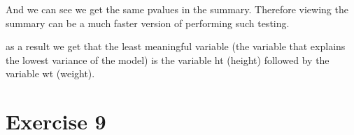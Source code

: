 \documentclass[]{article}
\begin{document}
And we can see we get the same pvalues in the summary. Therefore viewing
the summary can be a much faster version of performing such testing.

as a result we get that the least meaningful variable (the variable that
explains the lowest variance of the model) is the variable ht (height)
followed by the variable wt (weight).

\hypertarget{exercise-9}{%
\section{Exercise 9}\label{exercise-9}}
\end{document}
